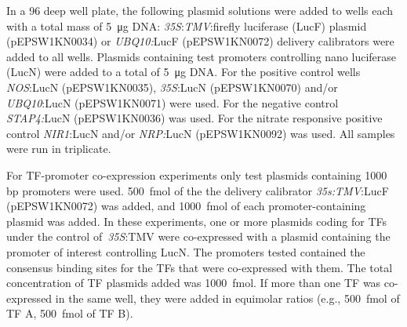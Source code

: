 \documentclass[../main.tex]{subfiles}
\begin{document}

In a 96 deep well plate, the following plasmid solutions were added to
wells each with a total mass of \SI{5}{\micro\gram} DNA: \textit{35S}:\textit{TMV}:firefly
luciferase (LucF) plasmid (pEPSW1KN0034) or \textit{UBQ10:}LucF
(pEPSW1KN0072) delivery calibrators were added to all wells. Plasmids
containing test promoters controlling nano luciferase (LucN) were added to a total of \SI{5}{\micro\gram} DNA. For the positive control wells \textit{NOS}:LucN
(pEPSW1KN0035), \textit{35S}:LucN (pEPSW1KN0070) and/or \textit{UBQ10}:LucN
(pEPSW1KN0071) were used. For the negative control \textit{STAP4:}LucN
(pEPSW1KN0036) was used. For the nitrate responsive positive
control \textit{NIR1}:LucN and/or \textit{NRP:}LucN (pEPSW1KN0092) was used. All samples were run in triplicate.

For TF\hyp{}promoter co\hyp{}expression experiments only test plasmids containing 1000 bp promoters were used.
\SI{500}{\fmol} of the the delivery calibrator \textit{35s:TMV}:LucF (pEPSW1KN0072) was added, and \SI{1000}{\fmol} of each promoter\hyp{}containing plasmid was added.
In these experiments, one or more plasmids coding for TFs under the control of~\textit{35S}:TMV were co\hyp{}expressed with a plasmid containing the promoter of interest controlling LucN.
The promoters tested contained the consensus binding sites for the TFs that were co\hyp{}expressed with them.
The total concentration of TF plasmids added was \SI{1000}{\fmol}. If more than one TF was co-expressed in the same well, they were added in equimolar ratios (e.g., \SI{500}{\fmol} of TF A, \SI{500}{\fmol} of TF B).
\end{document}

